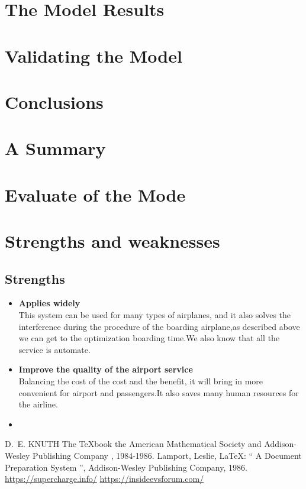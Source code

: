 \documentclass{mcmthesis}
\begin{document}
\section{The Model Results}


\section{Validating the Model}


\section{Conclusions}


\section{A Summary}


\section{Evaluate of the Mode}

\section{Strengths and weaknesses}


\subsection{Strengths}
\begin{itemize}
\item \textbf{Applies widely}\\
This  system can be used for many types of airplanes, and it also
solves the interference during  the procedure of the boarding
airplane,as described above we can get to the  optimization
boarding time.We also know that all the service is automate.
\item \textbf{Improve the quality of the airport service}\\
Balancing the cost of the cost and the benefit, it will bring in
more convenient  for airport and passengers.It also saves many
human resources for the airline. 
\item \textbf{}
\end{itemize}

\begin{thebibliography}{99}
 D.~E. KNUTH   The \TeX{}book  the American
Mathematical Society and Addison-Wesley
Publishing Company , 1984-1986.
Lamport, Leslie,  \LaTeX{}: `` A Document Preparation System '',
Addison-Wesley Publishing Company, 1986.
\url{https://supercharge.info/}
\url{https://insideevsforum.com/}
\end{thebibliography}
\end{document}
